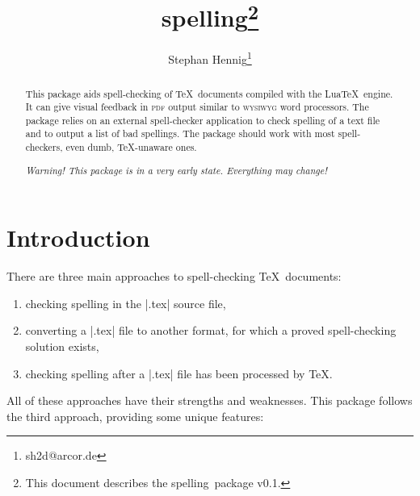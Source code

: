 \documentclass[11pt]{article}
\newcommand*{\pkg}{\textsf{spelling}}
\newcommand*{\acr}[1]{\mbox{\scshape#1}}
\begin{document}
\author{Stephan Hennig\thanks{sh2d@arcor.de}}
\title{\pkg\thanks{This document describes the \pkg\ package v0.1.}}
\maketitle


\begin{abstract}
  This package aids spell-checking of \TeX\ documents compiled with the
  Lua\TeX\ engine.  It can give visual feedback in \acr{pdf} output
  similar to \acr{wysiwyg} word processors.  The package relies on an
  external spell-checker application to check spelling of a text file
  and to output a list of bad spellings.  The package should work with
  most spell-checkers, even dumb, \TeX-unaware ones.

  \emph{Warning!  This package is in a very early state.  Everything may
    change!}
\end{abstract}

\begin{multicols}{2}
\small
\makeatletter
\renewcommand{\@tocrmarg}{2.55em plus1fil}
\makeatother
\tableofcontents
\end{multicols}


\section{Introduction}
\label{sec:intro}

There are three main approaches to spell-checking \TeX\ documents:

\begin{enumerate}

\item checking spelling in the |.tex| source file,

\item converting a |.tex| file to another format, for which a proved
  spell-checking solution exists,

\item checking spelling after a |.tex| file has been processed by \TeX.

\end{enumerate}

All of these approaches have their strengths and weaknesses.  This
package follows the third approach, providing some unique features:
\end{document}
